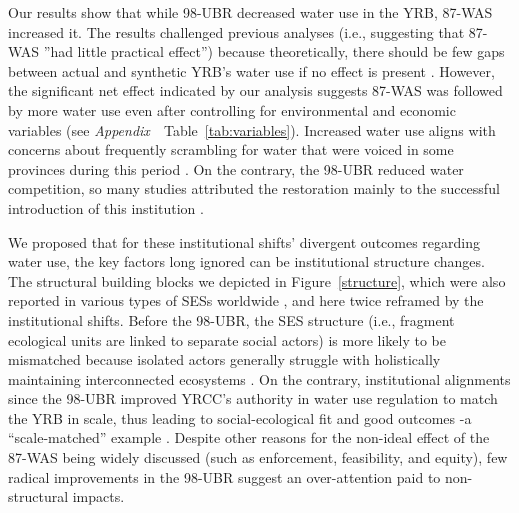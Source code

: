 
\label{discussion-1}
Our results show that while 98-UBR decreased water use in the YRB, 87-WAS increased it.
The results challenged previous analyses (i.e., suggesting that 87-WAS ''had little practical effect'') because theoretically, there should be few gaps between actual and synthetic YRB's water use if no effect is present \cite{abadie2015,hill2021}.
However, the significant net effect indicated by our analysis suggests 87-WAS was followed by more water use even after controlling for environmental and economic variables (see \textit{Appendix~}~Table~\ref{tab:variables}).
Increased water use aligns with concerns about frequently scrambling for water that were voiced in some provinces during this period \cite{mao2000}.
On the contrary, the 98-UBR reduced water competition, so many studies attributed the restoration mainly to the successful introduction of this institution \cite{chen2021,huangang2002,an2007}.

We proposed that for these institutional shifts' divergent outcomes regarding water use, the key factors long ignored can be institutional structure changes.
The structural building blocks we depicted in Figure~\ref{structure}, which were also reported in various types of SESs worldwide \cite{kluger2020,guerrero2015,bodin2012}, and here twice reframed by the institutional shifts.
Before the 98-UBR, the SES structure (i.e., fragment ecological units are linked to separate social actors) is more likely to be mismatched because isolated actors generally struggle with holistically maintaining interconnected ecosystems \cite{sayles2017,sayles2019,cai2016,bergsten2019}.
On the contrary, institutional alignments since the 98-UBR improved YRCC's authority in water use regulation to match the YRB in scale, thus leading to social-ecological fit and good outcomes -a ``scale-matched'' example \cite{cumming2020a,wang2019d}.
Despite other reasons for the non-ideal effect of the 87-WAS being widely discussed \cite{huangang2002} (such as enforcement, feasibility, and equity), few radical improvements in the 98-UBR suggest an over-attention paid to non-structural impacts.

